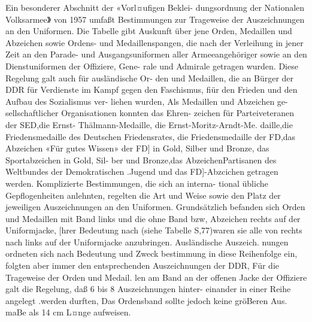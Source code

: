 

Ein besonderer Abschnitt der «Vorl¤ufigen Beklei-
dungsordnung der Nationalen Volksarmee》 von
1957 umfaßt Bestimmungen zur Trageweise der
Auszeichnungen an den Uniformen. Die Tabelle
gibt Auskunft über jene Orden, Medaillen und Abzeichen sowie Ordens- und Medaillenspangen, die
nach der Verleihung in jener Zeit an den Parade-
und Ausgangsuniformen aller Armeeangehöriger
sowie an den Dienstuniformen der Offiziere, Gene-
rale und Admirale getragen wurden.
Diese Regelung galt auch für ausländische Or-
den und Medaillen, die an Bürger der DDR für
Verdienste im Kampf gegen den Faschismus, fiür
den Frieden und den Aufbau des Sozialismus ver-
liehen wurden, Als Medaillen und Abzeichen ge-
sellschaftlicher Organisationen konnten das Ehren-
zeichen für Parteiveteranen der SED,die Ernst-
Thälmann-Medaille, die Ernst-Moritz-Arndt-Me.
daille,die Friedensmedaille des Deutschen Friedensrates, die Friedensmedaille der FD,das
Abzeichen «Für gutes Wissen» der FD] in Gold,
Silber und Bronze, das Sportabzeichen in Gold, Sil-
ber und Bronze,das AbzeichenPartisanen des
Weltbundes der Demokratischen .Jugend und das
FD]-Abzcichen getragen werden.
Komplizierte Bestimmungen, die sich an interna-
tional übliche Gepflogenheiten anlehnten, regelten
die Art und Weise sowie den Platz der jeweiligen
Auszeichnungen an den Uniformen. Grundsätzlich
befanden sich Orden und Medaillen mit Band links
und die ohne Band bzw, Abzeichen rechts auf der Uniformjacke, [hrer Bedeutung nach (siehe Tabelle
S,77)waren sie alle von rechts nach links auf der
Uniformjacke anzubringen. Ausländische Auszeich.
nungen ordneten sich nach Bedeutung und Zweck
bestimmung in diese Reihenfolge ein, folgten aber
immer den entsprechenden Auszeichnungen der
DDR, Für die Trageweise der Orden und Medail.
len am Band an der offenen Jacke der Offiziere galt
die Regelung, daß 6 bis 8 Auszeichnungen hinter-
einander in einer Reihe angelegt .werden durften,
Das Ordensband sollte jedoch keine gröBeren Aus.
maBe als 14 cm L¤nge aufweisen.